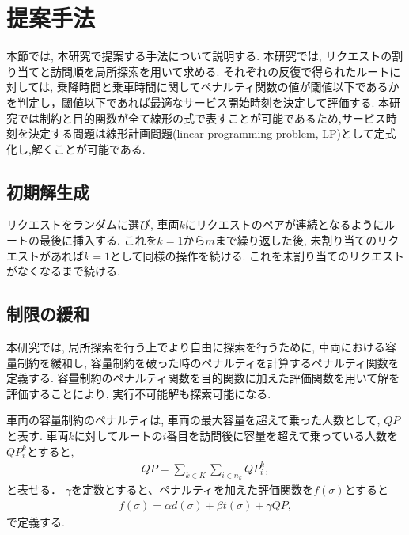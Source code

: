 \chapter{提案手法}\label{method}
本節では, 本研究で提案する手法について説明する. 本研究では, リクエストの割り当てと訪問順を局所探索を用いて求める. それぞれの反復で得られたルートに対しては, 乗降時間と乗車時間に関してペナルティ関数の値が閾値以下であるかを判定し，閾値以下であれば最適なサービス開始時刻を決定して評価する.
本研究では制約と目的関数が全て線形の式で表すことが可能であるため,サービス時刻を決定する問題は線形計画問題(linear programming problem, LP)として定式化し,解くことが可能である.
\section{初期解生成}
リクエストをランダムに選び, 車両$k$にリクエストのペアが連続となるようにルートの最後に挿入する. これを$k = 1 から m$まで繰り返した後, 未割り当てのリクエストがあれば$k = 1 $として同様の操作を続ける. これを未割り当てのリクエストがなくなるまで続ける.

\section{制限の緩和}
本研究では, 局所探索を行う上でより自由に探索を行うために, 車両における容量制約を緩和し, 容量制約を破った時のペナルティを計算するペナルティ関数を定義する. 容量制約のペナルティ関数を目的関数に加えた評価関数を用いて解を評価することにより, 実行不可能解も探索可能になる.

車両の容量制約のペナルティは, 車両の最大容量を超えて乗った人数として, $QP$と表す. 車両$k$に対してルートの$i$番目を訪問後に容量を超えて乗っている人数を$QP_i^k$とすると,
\begin{align*}
  QP = \sum_{k \in K}\sum_{i \in n_k} QP_i^k,
\end{align*}
と表せる．
$\gamma$を定数とすると、ペナルティを加えた評価関数を$f(\sigma)$とすると
\begin{align*}
  f(\sigma) = \alpha d(\sigma)+ \beta t(\sigma) + \gamma QP,
\end{align*}
で定義する.
